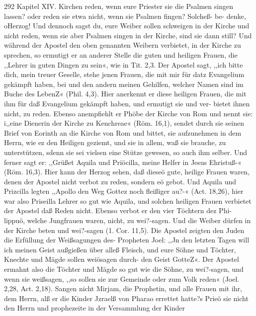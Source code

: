 292 Kapitel XIV.
Kirchen reden, wenn eure Priester sie die Psalmen singen lassen?
oder reden sie etwa nicht, wenn sie Psalmen fingen? Solcheß- be-
denke, oHerzog! Und dennoch sagst du, eure Weiber sollen schweigen
in der Kirche und nicht reden, wenn sie aber Psalmen singen in
der Kirche, sind sie dann still? Und während der Apostel den
oben genannten Weibern verbietet, in der Kirche zu sprechen, so
ermutigt er an anderer Stelle die guten und heiligen Frauen, die
,,Lehrer in guten Dingen zu sein«, wie in Tit. 2,3. Der Apostel
sagt, ,,ich bitte dich, mein treuer Geselle, stehe jenen Frauen, die
mit mir für datz Evangelium gekämpft haben, bei und den andern
meinen Gehilfen, welcher Namen sind im Buche des LebenZ«
(Phil. 4,3). Hier anerkennt er diese heiligen Frauen, die mit ihm
für daß Evangelium gekämpft haben, und ermutigt sie und ver-
bietet ihnen nicht, zu reden. Ebenso anempfiehlt er Phöbe der
Kirche von Rom und nennt sie: i,,eine Dienerin der Kirche zu
Kenchreae« (Röm. 16,1), sendet durch sie seinen Brief von Eorinth
an die Kirche von Rom und bittet, sie aufzunehmen in dem
Herrn, wie ez den Heiligen geziemt, und sie in allem, waß sie
brauche, zu unterstützen, sdenn sie sei vielsen eine Stütze gewesen,
so auch ihm selber. Und ferner sagt er: ,,Grüßet Aquila und
Priöcilla, meine Helfer in Jesus Ehristuß-« (Röm. 16,3). Hier
kann der Herzog sehen, daß dieseö gute, heilige Frauen waren,
denen der Apostel nicht verbot zu reden, sondern eö gebot.
Und Aquila und Prizcilla legten ,,Apollo den Weg Gottez noch
fleißiger au?-« (Act. 18,26), hier war also Priseilla Lehrer so gut
wie Aquila, und solchen heiligen Frauen verbietet der Apostel
daß Reden nicht. Ebenso verbot er den vier Töchtern dez Phi-
lippuö, welche Jungfrauen waren, nicht, zu wei?-sagen. Und die
Weiber dürfen in der Kirche beten und wei?-sagen (1. Cor. 11,5).
Die Apostel zeigten den Juden die Erfüllung der Weißsagungen
des- Propheten Joel: ,,Jn den letzten Tagen will ich meinen
Geist außgießen über alleß Fleisch, und eure Söhne und Töchter,
Knechte und Mägde sollen weiösagen durch- den Geist GotteZ«.
Der Apostel ermahnt also die Töchter und Mägde so gut wie die
Söhne, zu wei?-sagen, und wenn sie weißsagen, ,,so sollen sie zur
Gemeinde oder zum Volk reden« (Joel. 2,28, Act. 2,18). Sangen
nicht Mirjam, die Prophetin, und alle Frauen mit ihr, dem Herrn,
alß er die Kinder Jzraelß von Pharao errettet hatte?s Prieö sie
nicht den Herrn und prophezeite in der Versammlung der Kinder


